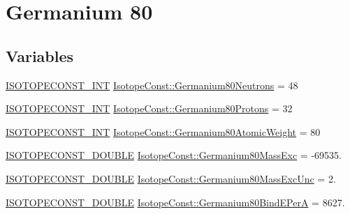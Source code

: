 \hypertarget{group___isotope_const-_germanium-_ge80}{}\section{Germanium 80}
\label{group___isotope_const-_germanium-_ge80}
\subsection*{Variables}
\begin{DoxyCompactItemize}
\item 
\mbox{\hyperlink{group___isotope_const-_macros_ga5f18360b3e99483a35c32d789e62621c}{I\+S\+O\+T\+O\+P\+E\+C\+O\+N\+S\+T\+\_\+\+I\+NT}} \mbox{\hyperlink{group___isotope_const-_germanium-_ge80_ga18a61782457efbf7b955f4a72bcd85e3}{Isotope\+Const\+::\+Germanium80\+Neutrons}} = 48
\item 
\mbox{\hyperlink{group___isotope_const-_macros_ga5f18360b3e99483a35c32d789e62621c}{I\+S\+O\+T\+O\+P\+E\+C\+O\+N\+S\+T\+\_\+\+I\+NT}} \mbox{\hyperlink{group___isotope_const-_germanium-_ge80_ga56ec9faf74268a2ebdd3ab745df6b556}{Isotope\+Const\+::\+Germanium80\+Protons}} = 32
\item 
\mbox{\hyperlink{group___isotope_const-_macros_ga5f18360b3e99483a35c32d789e62621c}{I\+S\+O\+T\+O\+P\+E\+C\+O\+N\+S\+T\+\_\+\+I\+NT}} \mbox{\hyperlink{group___isotope_const-_germanium-_ge80_ga6c11654ea7bef7f76d905b5743a0f67e}{Isotope\+Const\+::\+Germanium80\+Atomic\+Weight}} = 80
\item 
\mbox{\hyperlink{group___isotope_const-_macros_ga8f45a7272ce02c0b4c65c44636ed719a}{I\+S\+O\+T\+O\+P\+E\+C\+O\+N\+S\+T\+\_\+\+D\+O\+U\+B\+LE}} \mbox{\hyperlink{group___isotope_const-_germanium-_ge80_ga290b2ed747a090a42b63787f47f57e7e}{Isotope\+Const\+::\+Germanium80\+Mass\+Exc}} = -\/69535.
\item 
\mbox{\hyperlink{group___isotope_const-_macros_ga8f45a7272ce02c0b4c65c44636ed719a}{I\+S\+O\+T\+O\+P\+E\+C\+O\+N\+S\+T\+\_\+\+D\+O\+U\+B\+LE}} \mbox{\hyperlink{group___isotope_const-_germanium-_ge80_gab86c2f0c45a2e62aa348d3e91589cafd}{Isotope\+Const\+::\+Germanium80\+Mass\+Exc\+Unc}} = 2.
\item 
\mbox{\hyperlink{group___isotope_const-_macros_ga8f45a7272ce02c0b4c65c44636ed719a}{I\+S\+O\+T\+O\+P\+E\+C\+O\+N\+S\+T\+\_\+\+D\+O\+U\+B\+LE}} \mbox{\hyperlink{group___isotope_const-_germanium-_ge80_gaf0ad4ec798d3bacf71b3709e39253bf8}{Isotope\+Const\+::\+Germanium80\+Bind\+E\+PerA}} = 8627.
\item 

\end{DoxyCompactItemize}

